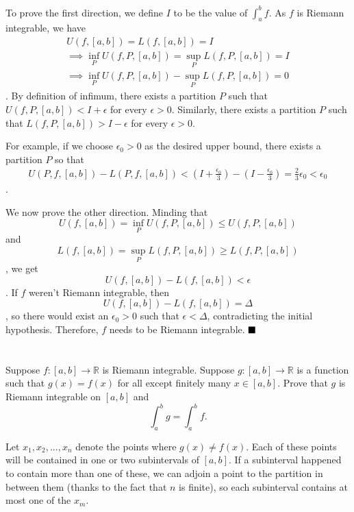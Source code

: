 \documentclass[11pt, a4paper, tikz]{article}
\newcommand{\centsection}[1]{
	\section*{\centering{#1}}
}
\renewcommand{\qed}{\hfill\blacksquare}
\begin{document}
	To prove the first direction, we define $I$ to be the value of $\int_{a}^{b}f$. As $f$ is Riemann integrable, we have \begin{align*}
		U(f,[a,b])=L(f,[a,b])=I\\
		\implies\inf_PU(f,P,[a,b])=\sup_PL(f,P,[a,b])=I\\ \implies\inf_PU(f,P,[a,b])-\sup_PL(f,P,[a,b])=0
	\end{align*}.
	By definition of infimum, there exists a partition $P$ such that $U(f,P,[a,b])< I+\epsilon$ for every $\epsilon>0$. Similarly, there exists a partition $P$ such that $L(f,P,[a,b])>I-\epsilon$ for every $\epsilon>0$.
	
	For example, if we choose $\epsilon_0>0$ as the desired upper bound, there exists a partition $P$ so that
	\begin{align*}
		U(P,f,[a,b])-L(P,f,[a,b])<(I+\frac{\epsilon_0}{3})-(I-\frac{\epsilon_0}{3})=\frac{2}{3}\epsilon_0 < \epsilon_0
	\end{align*}.
	
	We now prove the other direction. Minding that \[U(f,[a,b])=\inf_PU(f,P,[a,b])\leq U(f,P,[a,b])\] and \[L(f,[a,b])=\sup_PL(f,P,[a,b])\geq L(f,P,[a,b])\], we get \[U(f,[a,b])-L(f,[a,b])<\epsilon\]. If $f$ weren't Riemann integrable, then \[U(f,[a,b])-L(f,[a,b])=\Delta\], so there would exist an $\epsilon_0>0$ such that $\epsilon<\Delta$, contradicting the initial hypothesis. Therefore, $f$ needs to be Riemann integrable.
	$\qed$
	
	\centsection{Exercise 6}
	
	\begin{formulationBox}
		Suppose $f:[a,b]\rightarrow\mathbb{R}$ is Riemann integrable. Suppose $g:[a,b]\rightarrow\mathbb{R}$ is a function such that $g(x) = f(x)$ for all except finitely many $x\in[a,b]$. Prove that $g$ is Riemann integrable on $[a,b]$ and \[\int_a^bg=\int_a^bf.\]
	\end{formulationBox}

	Let $x_1, x_2, ..., x_n$ denote the points where $g(x)\neq f(x)$. Each of these points will be contained in one or two subintervals of $[a,b]$. If a subinterval happened to contain more than one of these, we can adjoin a point to the partition in between them (thanks to the fact that $n$ is finite), so each subinterval contains at most one of the $x_m$.
	
\end{document}
